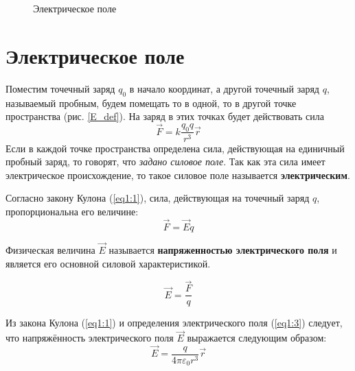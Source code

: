 \begin{figure}[h]
{        } 
        \hfill
        \caption{Электрическое поле}
    \end{figure} 

\section{Электрическое поле}
    Поместим точечный заряд \( q_0 \) в начало координат, а другой точечный 
    заряд \( q \), называемый пробным, будем помещать то в одной, то в другой 
    точке пространства (рис. \ref{E_def}). На заряд в этих точках будет 
    действовать сила
    \[
        \vec{F} = k\frac{q_0q}{r^3}\vec{r}
    \]
    Если в каждой точке пространства определена сила, действующая на единичный 
    пробный заряд, то говорят, что \textit{задано силовое поле}. Так как эта 
    сила имеет электрическое происхождение, то такое силовое поле называется 
    \textbf{электрическим}.
  
    Согласно закону Кулона (\ref{eq1:1}), сила, действующая на точечный заряд 
    \( q \), пропорциональна его величине:
    \begin{equation}
        \vec{F} = \vec{E}q\label{eq1:3}
    \end{equation}

    \begin{definition}
        Физическая величина \( \vec{E} \) называется \textbf{напряженностью 
        электрического поля} и является его основной силовой характеристикой.
    \end{definition}
    \begin{equation}
        \vec{E}=\frac{\vec{F}}{q} \label{eq1:4}
    \end{equation}
    
    Из закона Кулона (\ref{eq1:1}) и определения электрического поля
    (\ref{eq1:3}) следует, что напряжённость электрического поля \( \vec{E} \) 
    выражается следующим образом:
    \begin{equation}
        \vec{E} = \frac{q}{4\pi\varepsilon_0 r^3}\vec{r} \label{eq1:5}
    \end{equation}
  
